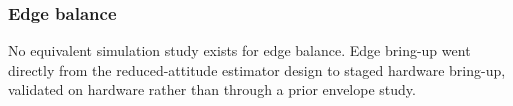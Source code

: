 \FloatBarrier

\subsubsection{Edge balance}
\label{sec:edge-results}

No equivalent simulation study exists for edge balance. Edge bring-up went
directly from the reduced-attitude estimator design to staged hardware
bring-up, validated on hardware rather than through a prior envelope study.
